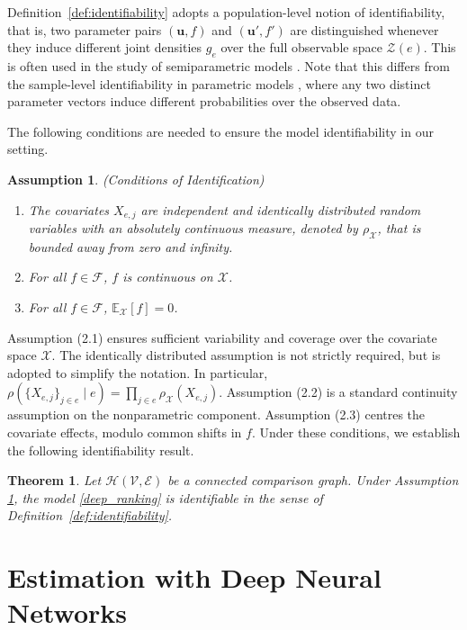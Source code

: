 \documentclass[
  12pt]{article}
\newtheorem{theorem}{Theorem}[section]
\newtheorem{assumption}{Assumption}
\begin{document}
Definition~\ref{def:identifiability} adopts a population-level notion of identifiability, that is, two parameter pairs $(\boldsymbol{u}, f)$ and $(\boldsymbol{u}', f')$ are distinguished whenever they induce different joint densities $g_e$ over the full observable space $\mathcal{Z}(e)$. This is often used in the study of semiparametric models \citep{matzkin1991semiparametric}. Note that this differs from the sample-level identifiability in parametric models \citep{fan2024uncertainty,dong2025statistical}, where any two distinct parameter vectors induce different probabilities over the observed data.

\noindent The following conditions are needed to ensure the model identifiability in our setting. 
\begin{assumption}(Conditions of Identification)
\label{ident_assumption}

\begin{enumerate}
\item[(2.1).] The covariates $X_{e, j}$ are independent and identically distributed random variables with an absolutely continuous measure, denoted by $\rho_{\mathcal{X}}$, that is bounded away from zero and infinity.
\item[(2.2).] For all $f \in \mathcal{F}$, $f$ is continuous on $\mathcal{X}$.
\item[(2.3).] For all $f \in \mathcal{F}$,\; $\mathbb{E}_{\mathcal{X}}[f] = 0$.
\end{enumerate}
\end{assumption}

\noindent Assumption (2.1) ensures sufficient variability and coverage over the covariate space $\mathcal{X}$. The identically distributed assumption is not strictly required, but is adopted to simplify the notation. In particular, $\rho(\{X_{e, j}\}_{j\in e} \mid e) 
= \prod_{j \in e}\rho_{\mathcal{X}}(X_{e,j})$. Assumption (2.2) is a standard continuity assumption on the nonparametric component. Assumption (2.3) centres the covariate effects, modulo common shifts in $f$. Under these conditions, we establish the following identifiability result.
\begin{theorem}
\label{lemma_ident}
Let $\mathcal{H}(\mathcal{V}, \mathcal{E})$ be a connected comparison graph. Under Assumption \ref{ident_assumption}, the model \eqref{deep_ranking} is identifiable in the sense of Definition~\ref{def:identifiability}. 
\end{theorem}

\section{Estimation with Deep Neural Networks}
\end{document}
